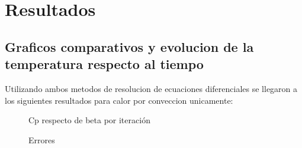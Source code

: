 \documentclass[11pt,a4paper]{article}
\begin{document}
\section{Resultados}

\subsection{Graficos comparativos y evolucion de la temperatura respecto al tiempo}

Utilizando ambos metodos de resolucion de ecuaciones diferenciales se llegaron a los siguientes resultados para calor por conveccion unicamente:

\begin{figure}[H]
	\caption{Cp respecto de beta por iteración}
	\label{fig:metodos}
\end{figure}

\begin{figure}[H]
	\caption{Errores}
	\label{fig:errores}
\end{figure}
\end{document}
